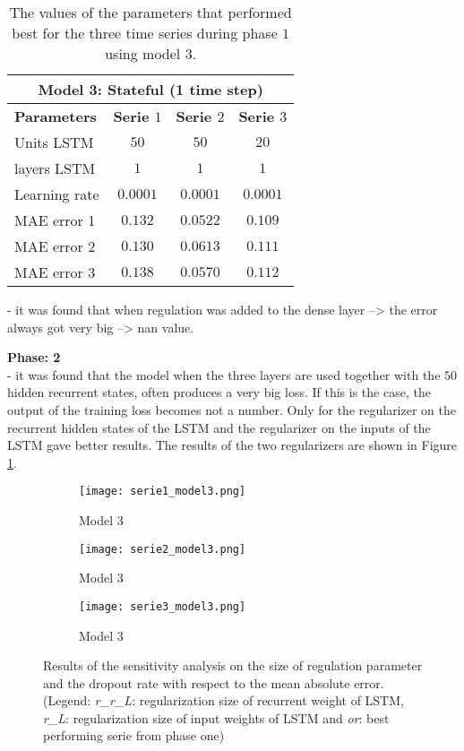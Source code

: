\begin{table}[ht]
	\centering
	\begin{tabular}{@{}l|ccc@{}} \toprule
		\multicolumn{4}{c}{Model 3: Stateful (1 time step)}\\\midrule\midrule
		\textbf{Parameters}	& \textbf{Serie $ 1 $} & \textbf{Serie $ 2 $} & \textbf{Serie $ 3 $}\\\midrule
		Units LSTM & $50 $&$ 50 $  & $20 $\\
		layers LSTM & $1 $&$ 1 $  & $1$\\
		Learning rate & $0.0001 $&$ 0.0001$  & $0.0001$\\\hline
		MAE error 1   & $ 0.132 $ & $ 0.0522 $ & $ 0.109 $\\
		MAE error 2   & $ 0.130 $ & $ 0.0613 $ & $ 0.111 $\\
		MAE error 3   & $ 0.138 $ & $ 0.0570 $ & $ 0.112 $\\\bottomrule
	\end{tabular}
	\caption{The values of the parameters that performed best for the three time series during phase $ 1 $ using model $3 $.}
	\label{tab:best_performing_para_phase1_model3}
\end{table}

- it was found that when regulation was added to the dense layer --> the error always got very big --> nan value. 


\textbf{Phase: 2}\\
- it was found that the model when the three layers are used together with the $ 50 $ hidden recurrent states, often produces a very big loss. If this is the case, the output of the training loss becomes not a number. Only for the regularizer on the recurrent hidden states of the LSTM and the regularizer on the inputs of the LSTM gave better results. The results of the two regularizers are shown in Figure \ref{fig:sensitivity_model3}.

\begin{figure}[ht]
	\centering
	\begin{subfigure}{0.49\linewidth}
		\texttt{[image: serie1\_model3.png]}
		\caption{Model 3}
	\end{subfigure}	
	\begin{subfigure}{0.49\linewidth}
		\texttt{[image: serie2\_model3.png]}
		\caption{Model 3}
	\end{subfigure}
	\begin{subfigure}{0.5\linewidth}
		\texttt{[image: serie3\_model3.png]}
		\caption{Model 3}
	\end{subfigure}
	\caption{Results of the sensitivity analysis on the size of regulation parameter and the dropout rate with respect to the mean absolute error.(Legend: \textit{r\_r\_L}: regularization size of recurrent weight of LSTM, \textit{r\_L}: regularization size of input weights of LSTM and \textit{or}: best performing serie from phase one)}
	\label{fig:sensitivity_model3}
\end{figure}



